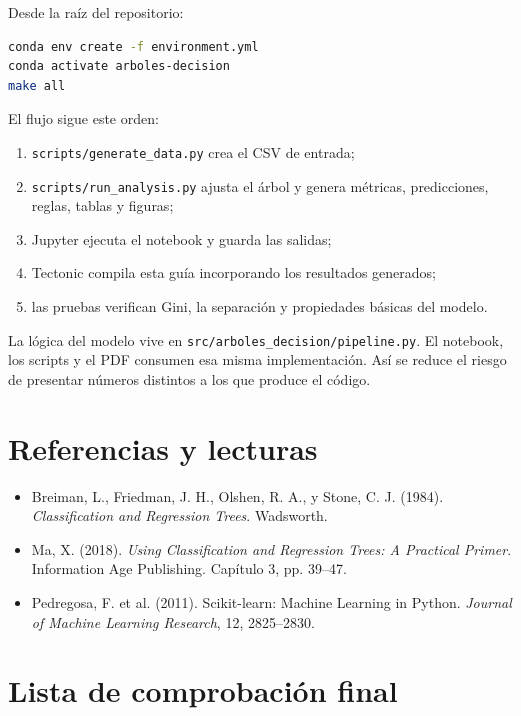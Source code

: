 \documentclass[11pt,oneside,openany]{book}
\begin{document}
Desde la raíz del repositorio:

\begin{lstlisting}[language=bash]
conda env create -f environment.yml
conda activate arboles-decision
make all
\end{lstlisting}

El flujo sigue este orden:

\begin{enumerate}
  \item \texttt{scripts/generate\_data.py} crea el CSV de entrada;
  \item \texttt{scripts/run\_analysis.py} ajusta el árbol y genera métricas,
  predicciones, reglas, tablas y figuras;
  \item Jupyter ejecuta el notebook y guarda las salidas;
  \item Tectonic compila esta guía incorporando los resultados generados;
  \item las pruebas verifican Gini, la separación y propiedades básicas del modelo.
\end{enumerate}

\begin{idea}
La lógica del modelo vive en \texttt{src/arboles\_decision/pipeline.py}. El
notebook, los scripts y el PDF consumen esa misma implementación. Así se reduce
el riesgo de presentar números distintos a los que produce el código.
\end{idea}

\backmatter
\chapter{Referencias y lecturas}

\begin{itemize}
  \item Breiman, L., Friedman, J. H., Olshen, R. A., y Stone, C. J. (1984).
  \emph{Classification and Regression Trees}. Wadsworth.
  \item Ma, X. (2018). \emph{Using Classification and Regression Trees: A
  Practical Primer}. Information Age Publishing. Capítulo 3, pp. 39--47.
  \item Pedregosa, F. et al. (2011). Scikit-learn: Machine Learning in Python.
  \emph{Journal of Machine Learning Research}, 12, 2825--2830.
\end{itemize}

\chapter*{Lista de comprobación final}
\end{document}
